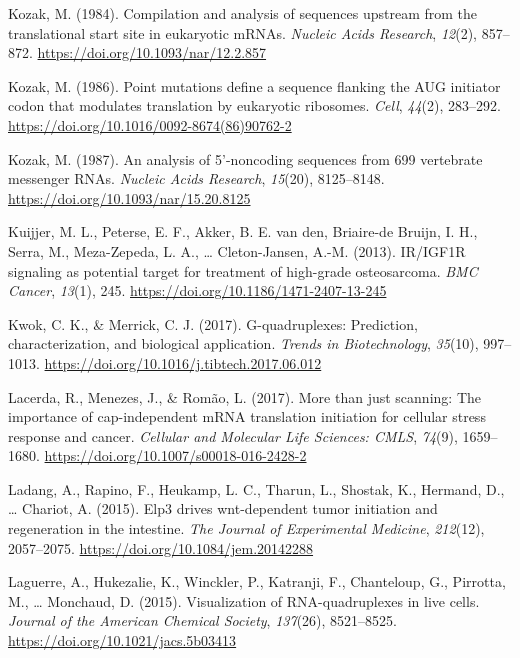 \documentclass[12pt,openany]{book}
\begin{document}
\hypertarget{ref-Kozak1984}{}
Kozak, M. (1984). Compilation and analysis of sequences upstream from
the translational start site in eukaryotic mRNAs. \emph{Nucleic Acids
Research}, \emph{12}(2), 857--872.
\url{https://doi.org/10.1093/nar/12.2.857}

\hypertarget{ref-Kozak1986}{}
Kozak, M. (1986). Point mutations define a sequence flanking the AUG
initiator codon that modulates translation by eukaryotic ribosomes.
\emph{Cell}, \emph{44}(2), 283--292.
\url{https://doi.org/10.1016/0092-8674(86)90762-2}

\hypertarget{ref-Kozak1987}{}
Kozak, M. (1987). An analysis of 5'-noncoding sequences from 699
vertebrate messenger RNAs. \emph{Nucleic Acids Research}, \emph{15}(20),
8125--8148. \url{https://doi.org/10.1093/nar/15.20.8125}

\hypertarget{ref-Kuijjer2013}{}
Kuijjer, M. L., Peterse, E. F., Akker, B. E. van den, Briaire-de Bruijn,
I. H., Serra, M., Meza-Zepeda, L. A., \ldots{} Cleton-Jansen, A.-M.
(2013). IR/IGF1R signaling as potential target for treatment of
high-grade osteosarcoma. \emph{BMC Cancer}, \emph{13}(1), 245.
\url{https://doi.org/10.1186/1471-2407-13-245}

\hypertarget{ref-Kwok2017}{}
Kwok, C. K., \& Merrick, C. J. (2017). G-quadruplexes: Prediction,
characterization, and biological application. \emph{Trends in
Biotechnology}, \emph{35}(10), 997--1013.
\url{https://doi.org/10.1016/j.tibtech.2017.06.012}

\hypertarget{ref-Lacerda2017}{}
Lacerda, R., Menezes, J., \& Romão, L. (2017). More than just scanning:
The importance of cap-independent mRNA translation initiation for
cellular stress response and cancer. \emph{Cellular and Molecular Life
Sciences: CMLS}, \emph{74}(9), 1659--1680.
\url{https://doi.org/10.1007/s00018-016-2428-2}

\hypertarget{ref-Ladang2015}{}
Ladang, A., Rapino, F., Heukamp, L. C., Tharun, L., Shostak, K.,
Hermand, D., \ldots{} Chariot, A. (2015). Elp3 drives wnt-dependent
tumor initiation and regeneration in the intestine. \emph{The Journal of
Experimental Medicine}, \emph{212}(12), 2057--2075.
\url{https://doi.org/10.1084/jem.20142288}

\hypertarget{ref-Laguerre2015}{}
Laguerre, A., Hukezalie, K., Winckler, P., Katranji, F., Chanteloup, G.,
Pirrotta, M., \ldots{} Monchaud, D. (2015). Visualization of
RNA-quadruplexes in live cells. \emph{Journal of the American Chemical
Society}, \emph{137}(26), 8521--8525.
\url{https://doi.org/10.1021/jacs.5b03413}
\end{document}
